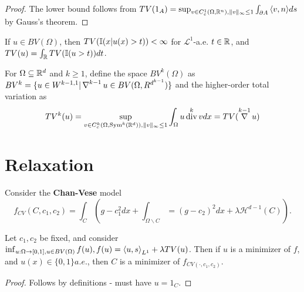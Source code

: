 \begin{proof}
  The lower bound follows from $TV(1_{A}) = \sup_{v \in
    C_{c}^{1}(\Omega, \R^{n}), \| v \|_{\infty} \leq 1} \int_{\partial
    A} \IP{v, n} ds$ by Gauss's theorem.
\end{proof}

\begin{thm}
  \label{sec:total-vari-appl-3}
  If $u \in BV(\Omega)$, then $TV(\I{x|u(x) > t}) < \infty$ for
  $\mathcal{L}^{1}$-a.e. $t \in \mathbb{R}$, and $TV(u) = \int_{\R} TV(\I{u >
    t}) dt$.
\end{thm}

\begin{defn}
  \label{sec:total-vari-appl-4}
  For $\Omega \subseteq \mathbb{R}^{d}$ and $k \geq 1$, define the space
  $BV^{k}(\Omega)$ as $BV^{k} = \{ u \in W^{k-1, 1} | \operatorname*{\nabla}^{k-1}u \in
BV(\Omega, R^{d^{k-1}}) \}$ and the higher-order total variation as
\begin{align}
  \label{eq:56}
  TV^{k}(u) = \sup_{v \in C_{c}^{k}(\Omega, \operatorname*{Sym}^{k}(\mathbb{R}^{d})), \| v
    \|_{\infty} \leq 1} \int_{\Omega} u \operatorname*{div}^{k} v dx = TV(\operatorname*{\nabla}^{k-1}
  u)
\end{align}
\end{defn}

\section{Relaxation}
\label{sec:relaxation}

\begin{defn}
  Consider the \textbf{Chan-Vese} model
  \begin{equation}
    \label{eq:58}
    f_{CV}(C, c_{1}, c_{2}) = \int_{C} (g - c_{1}^{2} dx +
    \int_{\Omega \backslash C} = (g - c_{2})^{2} dx + \lambda \mathcal{H}^{d-1}(C)).
  \end{equation}
\end{defn}

\begin{thm}
  Let $c_{1}, c_{2}$ be fixed, and consider $\inf_{u: \Omega
    \rightarrow [0, 1], u \in BV(\Omega)} f(u), f(u) = \IP{u,
    s}_{L^{1}} + \lambda TV(u)$.  Then if $u$ is a minimizer of $f$,
  and $u(x) \in \{ 0, 1 \} a.e.$, then $C$ is a minimizer of
  $f_{CV(\cdot, c_{1}, c_{2})}$.
\end{thm}

\begin{proof}
  Follows by definitions - must have $u = 1_{C}$.
\end{proof}

